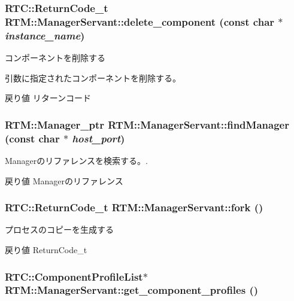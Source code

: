 \subsubsection[{delete\_\-component}]{\setlength{\rightskip}{0pt plus 5cm}RTC::ReturnCode\_\-t RTM::ManagerServant::delete\_\-component (const char $\ast$ {\em instance\_\-name})}\label{classRTM_1_1ManagerServant_a30cc0c1da9580f412aafef08e7f0d74d}


コンポーネントを削除する 

引数に指定されたコンポーネントを削除する。

\begin{DoxyReturn}{戻り値}
リターンコード 
\end{DoxyReturn}
\subsubsection[{findManager}]{\setlength{\rightskip}{0pt plus 5cm}RTM::Manager\_\-ptr RTM::ManagerServant::findManager (const char $\ast$ {\em host\_\-port})}\label{classRTM_1_1ManagerServant_aee3038a2250ec62f224c7df2f8edffd9}


Managerのリファレンスを検索する。. 

\begin{DoxyReturn}{戻り値}
Managerのリファレンス 
\end{DoxyReturn}
\subsubsection[{fork}]{\setlength{\rightskip}{0pt plus 5cm}RTC::ReturnCode\_\-t RTM::ManagerServant::fork ()}\label{classRTM_1_1ManagerServant_a4b78fb03a5989eb1c4f6de722603bca5}


プロセスのコピーを生成する 

\begin{DoxyReturn}{戻り値}
ReturnCode\_\-t 
\end{DoxyReturn}
\subsubsection[{get\_\-component\_\-profiles}]{\setlength{\rightskip}{0pt plus 5cm}RTC::ComponentProfileList$\ast$ RTM::ManagerServant::get\_\-component\_\-profiles ()}\label{classRTM_1_1ManagerServant_a3fac7c58f63f3f879c014ab7f77efd93}


